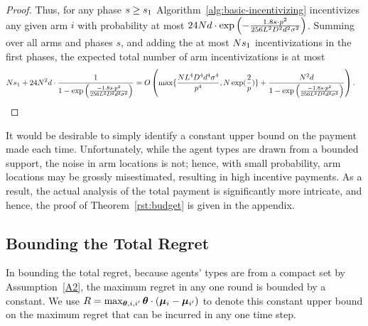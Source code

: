 \begin{proof}
Thus, for any phase $s \geq s_1$
Algorithm~\ref{alg:basic-incentivizing} incentivizes any given arm $i$
with probability at most
$24 N d \cdot \exp \left(
  -\frac{1.8 s \cdot p^2}{256 L^2 D^2 d^2 \sigma^2}
\right)$.
Summing over all arms and phases $s$,
and adding the at most $N s_1$ incentivizations in
the first \EvenLaterPhase phases, 
the expected total number of arm incentivizations is at most
\begin{align*}
N s_1
  + 24 N^2 d \cdot \frac{1}{1 - \exp \left(
    \frac{-1.8 s \cdot p^2}{256 L^2 D^2 d^2 \sigma^2}
  \right)}
& = O\left( \max\{\frac{N L^4 D^4 d^4 \sigma^4}{p^4}, N\exp(\frac{2}{p})\}
  + \frac{N^2 d}{1 - \exp \left(
    \frac{-1.8 s \cdot p^2}{256 L^2 D^2 d^2 \sigma^2}
  \right)} \right).
\end{align*}

\end{proof}

It would be desirable to simply identify a constant upper bound on the
payment made each time.
Unfortunately, while the agent types are drawn from a bounded support,
the noise in arm locations is not;
hence, with small probability, arm locations may be grossly
misestimated, resulting in high incentive payments.
As a result, the actual analysis of the total payment is significantly more
intricate, and hence,
the proof of Theorem~\ref{rst:budget} is given in the appendix.


\subsection{Bounding the Total Regret}
In bounding the total regret, because agents' types are from a compact
set by Assumption~\ref{A2}, the maximum regret in any one round is
bounded by a constant.
We use $R = \max_{\bm{\theta}, i,i'} \bm{\theta} \cdot (\bm{\mu}_{i} - \bm{\mu}_{i'})$
to denote this constant upper bound on the maximum regret that can be
incurred in any one time step. 


